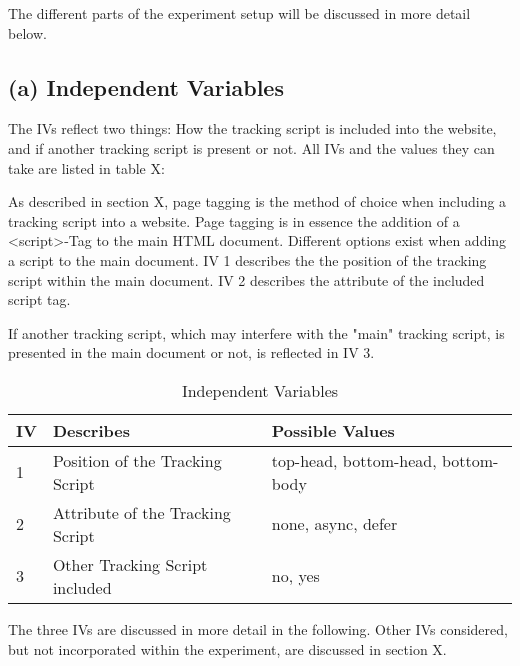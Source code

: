 The different parts of the experiment setup will be discussed in more detail below.





\subsection{(a) Independent Variables}


The IVs reflect two things:
How the tracking script is included into the website, and if another tracking script is present or not.
All IVs and the values they can take are listed in table X:

As described in section X, page tagging is the method of choice when including a tracking script into a website.
Page tagging is in essence the addition of a <script>-Tag to the main HTML document.
Different options exist when adding a script to the main document.
IV 1 describes the the position of the tracking script within the main document.
IV 2 describes the attribute of the included script tag.

If another tracking script, which may interfere with the "main" tracking script, is presented in the main document or not, is reflected in IV 3.

\begin{table}[h]
	\small
	\centering
	\begin{tabular}{ | l | l | l | }
	\hline
	IV \cellcolor{lightgrey} & Describes \cellcolor{lightgrey} & Possible Values \cellcolor{lightgrey} \\
	\hline
	1 & Position of the Tracking Script & top-head, bottom-head, bottom-body \\
	2 & Attribute of the Tracking Script & none, async, defer \\
	3 & Other Tracking Script included & no, yes \\
	\hline
	\end{tabular}
	\medskip
	\caption{Independent Variables}
	\label{table:independent_variables}
\end{table}


The three IVs are discussed in more detail in the following.
Other IVs considered, but not incorporated within the experiment, are discussed in section X.


